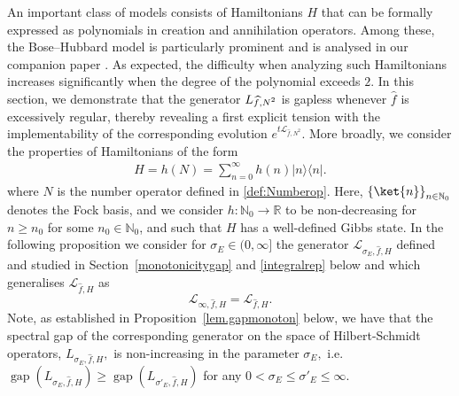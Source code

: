\documentclass[11pt]{amsart}
\newcommand{\1}{\mathbbm{1}}
\newcommand{\kb}[1]{|#1\rangle\!\langle#1|}
\newcommand{\R}{\mathbb{R}}
\newcommand{\N}{\mathbb{N}}
\newcommand{\cL}{\mathcal{L}}
\theoremstyle{plain}
\theoremstyle{definition}
\theoremstyle{remark}
\numberwithin{equation}{section}
\begin{document}
An important class of models consists of Hamiltonians $H$ that can be formally expressed as polynomials in creation and annihilation operators. Among these, the Bose--Hubbard model is particularly prominent and is analysed in our companion paper \cite{BeckerRouzeSalzmannBose}. As expected, the difficulty when analyzing such Hamiltonians increases significantly when the degree of the polynomial exceeds $2$. In this section, we demonstrate that the generator $L_{\smash{\widehat{f},N^2}}$ is gapless whenever $\widehat{f}$ is excessively regular, thereby revealing a first explicit tension with the implementability of the corresponding evolution $e^{t\mathcal{L}_{\widehat{f},N^2}}$.
More broadly, we consider the properties of Hamiltonians 
of the form 
\begin{align}
\label{eq:NumPresHamiltonian}
    H = h(N) = \sum_{n=0}^\infty h(n) \kb{n}.
\end{align}
where $N$ is the number operator defined in \eqref{def:Numberop}. Here, $\left\{\ket{n}\right\}_{n\in\N_0}$ denotes the Fock basis, and we consider $h:\N_0\to \R$ to be non-decreasing for $n\ge n_0$ for some $n_0\in\N_0$, and such that $H$ has a well-defined Gibbs state. In the following proposition we consider for $\sigma_E\in(0,\infty]$ the generator $\cL_{\sigma_E,\widehat f,H}$ defined and studied in Section~\ref{monotonicitygap} and \ref{integralrep} below and which generalises $\cL_{\widehat f,H}$  as $$\cL_{\infty,\widehat f,H}=\cL_{\widehat f,H}.$$ Note, as established in Proposition~\ref{lem.gapmonoton} below, we have that the spectral gap of the corresponding generator on the space of Hilbert-Schmidt operators, $L_{\sigma_E,\hat f,H},$ is non-increasing in the parameter $\sigma_E,$  i.e.
$\operatorname{gap}(L_{\sigma_E,\widehat{f},H})\ge \operatorname{gap}(L_{\sigma'_E,\widehat{f},H})$  for any  $0< \sigma_E\le \sigma'_E\le \infty.$
\end{document}
